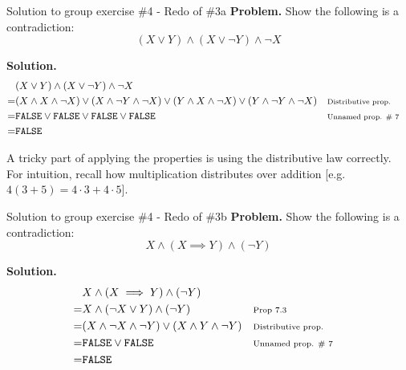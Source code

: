 \documentclass[10pt]{beamer}
\begin{document}
\begin{frame}{Solution to group exercise \#4 - Redo of  \#3a}
\footnotesize 
\textbf{Problem.} Show the following is a contradiction:
\[ (X \lor Y) \land (X \lor \lnot Y) \land \lnot X \]

\vfill 
\textbf{Solution.}
\begin{align*}
& (X \lor Y) \land (X \lor \lnot Y) \land \lnot X \\
=& (X \land X \land \lnot X) \lor (X \land \lnot Y \land \lnot X) \lor (Y \land X \land \lnot X) \lor (Y \land \lnot Y \land \lnot X) && \text{\scriptsize{{Distributive prop.}}} \\
=& \texttt{FALSE} \lor \texttt{FALSE} \lor  \texttt{FALSE} \lor  \texttt{FALSE}  && \text{\scriptsize{{Unnamed prop. \# 7}}} \\
=& \texttt{FALSE}
\end{align*}
\vfill 
\vfill
\begin{myredbox}[title=Remark]
A tricky part of applying the properties is using the distributive law correctly.  For intuition, recall how multiplication distributes over addition [e.g. $4(3+5) = 4 \cdot 3 + 4 \cdot 5$]. 
\end{myredbox}

\end{frame}

\begin{frame}{Solution to group exercise \#4 - Redo of  \#3b}
\footnotesize 
\textbf{Problem.} Show the following is a contradiction:
\[ X \land (X \implies Y) \land (\lnot Y) \]

\vfill 
\textbf{Solution.}
\begin{align*}
& X \land (X \implies Y) \land (\lnot Y) \\
=& 	 X \land (\lnot X \lor Y) \land (\lnot Y) && \text{\scriptsize{{Prop 7.3}}} \\
=& (X \land \lnot X \land \lnot Y) \lor (X \land Y \land \lnot Y) && \text{\scriptsize{{Distributive prop.}}} \\
=& \texttt{FALSE} \lor \texttt{FALSE} && \text{\scriptsize{{Unnamed prop. \# 7}}} \\
=& \texttt{FALSE}
\end{align*}
\end{frame}
\end{document}
